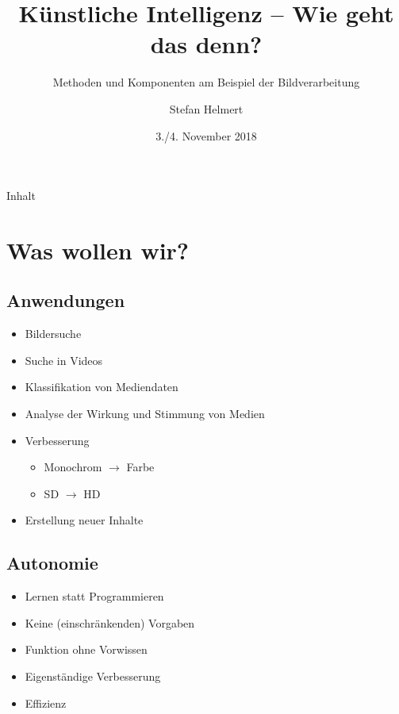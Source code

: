 \documentclass{beamer}
\title{Künstliche Intelligenz -- Wie geht das denn?}
\subtitle{Methoden und Komponenten am Beispiel der Bildverarbeitung}
\author{Stefan Helmert}
\institute[TU Chemnitz] %
{
  TU Chemnitz -- Professorship of Computer Graphics and Visualization
  
}
\institute[Chaostreff Chemnitz] %
{
	Chaostreff Chemnitz e.V.
	
}
\date{3./4. November 2018}
\begin{document}
\begin{frame}
  \titlepage
\end{frame}

\begin{frame}{Inhalt}
  \tableofcontents
\end{frame}


\section{Was wollen wir?}
\subsection{Anwendungen}
\begin{frame}{\insertsection}{\insertsubsection}
\begin{itemize}
	\item Bildersuche
	\item Suche in Videos
	\item Klassifikation von Mediendaten
	\item Analyse der Wirkung und Stimmung von Medien
	\item Verbesserung
	\begin{itemize}
		\item Monochrom $\rightarrow$ Farbe
		\item SD $\rightarrow$ HD
	\end{itemize}
	\item Erstellung neuer Inhalte
\end{itemize}
\end{frame}

\subsection{Autonomie}
\begin{frame}{\insertsection}{\insertsubsection}
	\begin{itemize}
		\item Lernen statt Programmieren
		\item Keine (einschränkenden) Vorgaben
		\item Funktion ohne Vorwissen
		\item Eigenständige Verbesserung
		\item Effizienz
	\end{itemize}
\end{frame}
\end{document}
